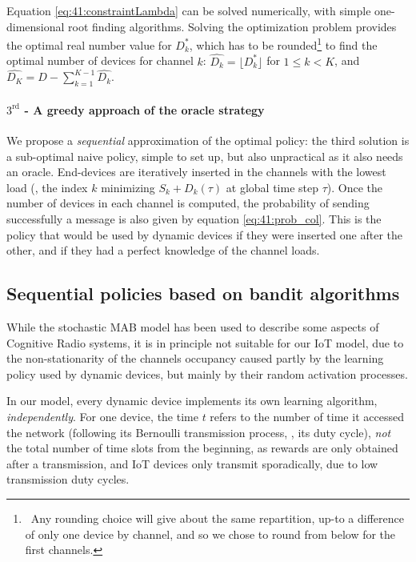 Equation \eqref{eq:41:constraintLambda} can be solved numerically, with simple one-dimensional root finding algorithms.
Solving the optimization problem provides the optimal real number value for $D_k^*$, which has to be rounded\footnote{~Any rounding choice will give about the same repartition, up-to a difference of only one device by channel, and so we chose to round from below for the first channels.} to find the optimal number of devices for channel $k$:
%
$\widehat{D_k} = \lfloor D_k^* \rfloor$ for $1 \leq k < K$, and $\widehat{D_{K}} = D - \sum_{k=1}^{K - 1} \widehat{D_k}$.

\paragraph{$3^{\text{rd}}$ - A greedy approach of the oracle strategy}

We propose a \emph{sequential} approximation of the optimal policy:
the third solution is a sub-optimal naive policy, simple to set up, but also unpractical as it also needs an oracle.
End-devices are iteratively inserted in the channels with the lowest load (\ie, the index $k$ minimizing $S_k + D_k(\tau)$ at global time step $\tau$). Once the number of devices in each channel is computed, the probability of sending successfully a message is also given by equation \eqref{eq:41:prob_col}.
This is the policy that would be used by dynamic devices if they were inserted one after the other, and if they had a perfect knowledge of the channel loads.


\subsection{Sequential policies based on bandit algorithms}
\label{sub:41:sequentialPolicies}

While the stochastic MAB model has been used to describe some aspects of Cognitive Radio systems, it is in principle not suitable for our IoT model, due to the non-stationarity of the channels occupancy caused partly by the learning policy used by dynamic devices, but mainly by their random activation processes.

In our model, every dynamic device implements its own learning algorithm, \emph{independently}.
For one device, the time $t$ refers to the number of time it accessed the network (following its Bernoulli transmission process, \ie, its duty cycle), \emph{not} the total number of time slots from the beginning, as rewards are only obtained after a transmission, and IoT devices only transmit sporadically, due to low transmission duty cycles.


